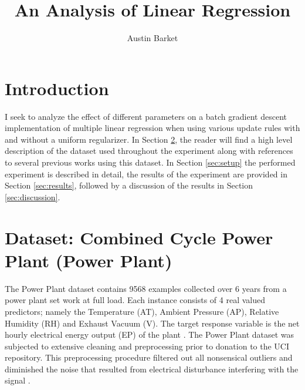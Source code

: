 \documentclass[runningheads]{llncs_2}
\begin{document}
\pagestyle{headings}
\mainmatter

\title{An Analysis of Linear Regression}
\titlerunning{}
\author{Austin Barket}
 \maketitle


\section{Introduction}

I seek to analyze the effect of different parameters on a batch gradient descent implementation of multiple linear regression when using various update rules with and without a uniform regularizer. In Section \ref{sec:dateset}, the reader will find a high level description of the dataset used throughout the experiment along with references to several previous works using this dataset. In Section \ref{sec:setup} the performed experiment is described in detail, the results of the experiment are provided in Section \ref{sec:results}, followed by a discussion of the results in Section \ref{sec:discussion}.


\section{Dataset: Combined Cycle Power Plant (Power Plant)}
\label{sec:dateset}

The Power Plant dataset contains 9568 examples collected over 6 years from a power plant set work at full load. Each instance consists of 4 real valued predictors; namely the  Temperature (AT), Ambient Pressure (AP), Relative Humidity (RH) and Exhaust Vacuum (V). The target response variable is the net hourly electrical energy output (EP) of the plant \cite{powerPlantDataset}. The Power Plant dataset was subjected to extensive cleaning and preprocessing prior to donation to the UCI repository. This preprocessing procedure filtered out all nonsensical outliers and diminished the noise that resulted from electrical disturbance interfering with the signal \cite{powerPlantCiteRequest1} \cite{powerPlantCiteRequest2}.
\end{document}
